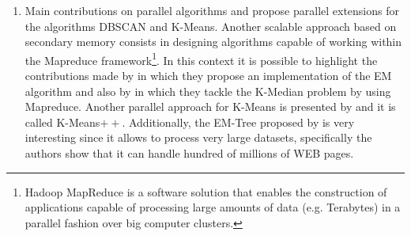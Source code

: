\documentclass[10pt]{article}
\begin{document}
\begin{enumerate}
\item Main contributions on parallel algorithms
\cite{XJK99} and \cite{DM99}  propose parallel extensions for the algorithms DBSCAN and K-Means. Another scalable approach based on secondary memory consists in designing algorithms capable of working within the Mapreduce framework\footnote{Hadoop MapReduce is a software solution that enables the construction of applications capable of processing large amounts of data (e.g. Terabytes) in a parallel fashion over big computer clusters.}. In this context it is possible to highlight the contributions made by \cite{DDGR07} in which they propose an implementation of the EM algorithm and also by \cite{EIM11} in which they tackle the K-Median problem by using Mapreduce. Another parallel approach for K-Means is presented by \cite{BMVKV12} and it is called K-Means$++$. Additionally, the EM-Tree proposed by \cite{VVGN15} is very interesting since it allows to process very large datasets, specifically the authors show that it can handle hundred of millions of WEB pages.


\end{enumerate}
\end{document}
